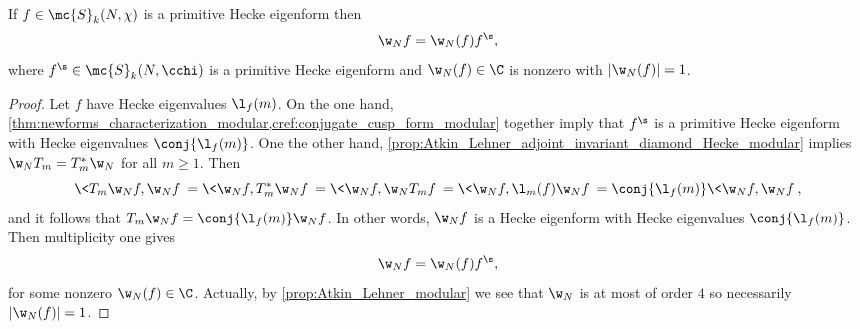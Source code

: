 \documentclass[12pt]{article}
\begin{document}
      \begin{proposition}\label{prop:Atkin_Lehner_conjugation_modular}
        If \(f \in \mc{S}_{k}(N,\chi)\) is a primitive Hecke eigenform then
        \[
          \w_{N}f = \w_{N}(f)f^{\s},
        \]
        where \(f^{\s} \in \mc{S}_{k}(N,\cchi)\) is a primitive Hecke eigenform and \(\w_{N}(f) \in \C\) is nonzero with \(|\w_{N}(f)| = 1\).
      \end{proposition}
      \begin{proof}
        Let \(f\) have Hecke eigenvalues \(\l_{f}(m)\). On the one hand, \cref{thm:newforms_characterization_modular,cref:conjugate_cusp_form_modular} together imply that \(f^{\s}\) is a primitive Hecke eigenform with Hecke eigenvalues \(\conj{\l_{f}(m)}\). One the other hand, \cref{prop:Atkin_Lehner_adjoint_invariant_diamond_Hecke_modular} implies \(\w_{N}T_{m} = T_{m}^{\ast}\w_{N}\) for all \(m \ge 1\). Then
        \[
          \<T_{m}\w_{N}f,\w_{N}f\> = \<\w_{N}f,T_{m}^{\ast}\w_{N}f\> = \<\w_{N}f,\w_{N}T_{m}f\> = \<\w_{N}f,\l_{m}(f)\w_{N}f\> = \conj{\l_{f}(m)}\<\w_{N}f,\w_{N}f\>,
        \]
        and it follows that \(T_{m}\w_{N}f = \conj{\l_{f}(m)}\w_{N}f\). In other words, \(\w_{N}f\) is a Hecke eigenform with Hecke eigenvalues \(\conj{\l_{f}(m)}\). Then multiplicity one gives
        \[
          \w_{N}f = \w_{N}(f)f^{\s},
        \]
        for some nonzero \(\w_{N}(f) \in \C\). Actually, by \cref{prop:Atkin_Lehner_modular} we see that \(\w_{N}\) is at most of order \(4\) so necessarily \(|\w_{N}(f)| = 1\).
      \end{proof} 
\end{document}
